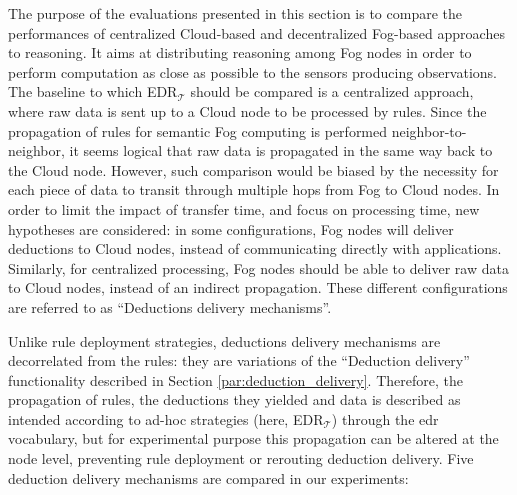 \documentclass{iosart2c}
\newcommand{\edrt}{EDR$_{\mathcal{T}}$\xspace}
\begin{document}
The purpose of the evaluations presented in this section is to compare the performances of centralized Cloud-based and decentralized Fog-based approaches to reasoning.
It aims at distributing reasoning among Fog nodes in order to perform computation as close as possible to the sensors producing observations.
The baseline to which \edrt should be compared is a centralized approach, where raw data is sent up to a Cloud node to be processed by rules.
Since the propagation of rules for semantic Fog computing is performed neighbor-to-neighbor, it seems logical that raw data is propagated in the same way back to the Cloud node.
However, such comparison would be biased by the necessity for each piece of data to transit through multiple hops from Fog to Cloud nodes.
In order to limit the impact of transfer time, and focus on processing time, new hypotheses are considered: in some configurations, Fog nodes will deliver deductions to Cloud nodes, instead of communicating directly with applications.
Similarly, for centralized processing, Fog nodes should be able to deliver raw data to Cloud nodes, instead of an indirect propagation.
These different configurations are referred to as ``Deductions delivery mechanisms''.

Unlike rule deployment strategies, deductions delivery mechanisms are decorrelated from the rules: they are variations of the ``Deduction delivery'' functionality described in Section \textsection \ref{par:deduction_delivery}.
Therefore, the propagation of rules, the deductions they yielded and data is described as intended according to ad-hoc strategies (here, \edrt) through the \gls{edr} vocabulary, but for experimental purpose this propagation can be altered at the node level, preventing rule deployment or rerouting deduction delivery.
Five deduction delivery mechanisms are compared in our experiments: 
\end{document}
